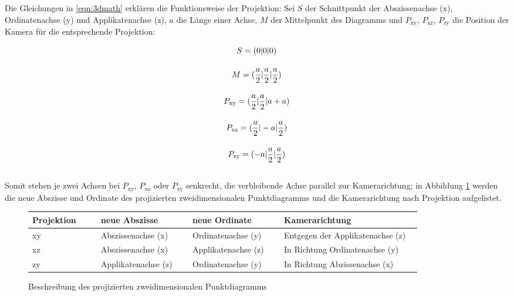 Die Gleichungen in \ref{eqn:3dmath} erklären die Funktionsweise der Projektion: Sei $S$ der Schnittpunkt der Abszissenachse (x), Ordinatenachse (y) und Applikatenachse (z), $a$ die Länge einer Achse, $M$ der Mittelpunkt des Diagramms und $P_{\text{xy}}$, $P_{\text{xz}}$, $P_{\text{zy}}$ die Position der Kamera für die entsprechende Projektion:

\begin{equation}
\begin{gathered}
S = (0|0|0)
\vspace{0.7\baselineskip}
\\
M = (\frac{a}{2} | \frac{a}{2} | \frac{a}{2})
\vspace{0.7\baselineskip}
\\
P_{\text{xy}} = (\frac{a}{2} | \frac{a}{2}| a + a)
\vspace{0.7\baselineskip}
\\
P_{\text{xz}} = (\frac{a}{2} | -a | \frac{a}{2})
\vspace{0.7\baselineskip}
\\
P_{\text{zy}} = (-a | \frac{a}{2}| \frac{a}{2})
\vspace{0.7\baselineskip}
\end{gathered}
\label{eqn:3dmath}
\end{equation}

\newpage
Somit stehen je zwei Achsen bei $P_{\text{xy}}$, $P_{\text{xz}}$ oder $P_{\text{zy}}$ senkrecht, die verbleibende Achse parallel zur Kamerarichtung; in Abbildung \ref{fig:3dtable} werden die neue Abszisse und Ordinate des projizierten zweidimensionalen Punktdiagramms und die Kamerarichtung nach Projektion aufgelistet.

\begin{figure}[H]
	\centering
	\begin{tabular}{ | m{0.15\linewidth} | m{0.2\linewidth} |m{0.2\linewidth} | m{0.3\linewidth} |}
		\hline
		\textbf{Projektion} & \textbf{neue Abszisse} & \textbf{neue Ordinate} & \textbf{Kamerarichtung}\\ \hline
		xy & Abszissenachse (x) & Ordinatenachse (y) & Entgegen der\newline
		Applikatenachse (z) \\ \hline
		xz & Abszissenachse (x) & Applikatenachse (z) & In Richtung\newline
		Ordinatenachse (y)\\ \hline
		zy & Applikatenachse (z) & Ordinatenachse (y) & In Richtung\newline
		Abzissenachse (x) \\ \hline
	\end{tabular}
	\caption{Beschreibung des projizierten zweidimensionalen Punktdiagramms}
	\label{fig:3dtable}
\end{figure}


